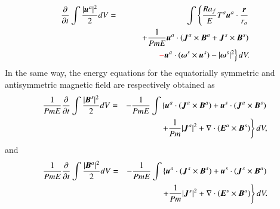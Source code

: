 %
\begin{eqnarray}
\displaystyle
\frac{\partial}{\partial t}
 \int \frac{|\mbox{\boldmath$u$}^a|^2}{2} d V 
 & = & \displaystyle
\int \left\{
      \frac{Ra_f}{E}T^a \mbox{\boldmath$u$}^a\cdot \frac{\mbox{\boldmath$r$}}{r_{o}}
     \right.
\nonumber \\
& & \displaystyle
\hspace*{2em}
     \left.
    + \frac{1}{Pm E} \mbox{\boldmath$u$}^a \cdot
                (\mbox{\boldmath$J$}^a \times \mbox{\boldmath$B$}^a
                +\mbox{\boldmath$J$}^s \times \mbox{\boldmath$B$}^s)
      \right.
\nonumber \\
& & \displaystyle
\hspace*{3em}
      \left.
     {\color{red} - } \mbox{\boldmath$u$}^a \cdot 
       (\mbox{\boldmath$\omega$}^s \times \mbox{\boldmath$u$}^s)
    - |\mbox{\boldmath$\omega$}^s|^2 
      \right\} d V.
\label{eq:energy_ua}
\end{eqnarray}
%
In the same way, the energy equations for the equatorially symmetric and antisymmetric magnetic field are respectively obtained as
%
\begin{eqnarray}
\displaystyle
\frac{1}{Pm E}\frac{\partial}{\partial t}
 \int \frac{|\mbox{\boldmath$B$}^s|^2}{2} d V
 & = & - \frac{1}{Pm E}\int \left\{
      \mbox{\boldmath$u$}^a \cdot 
          ( \mbox{\boldmath$J$}^a \times \mbox{\boldmath$B$}^a )
    + \mbox{\boldmath$u$}^s \cdot 
          ( \mbox{\boldmath$J$}^a \times \mbox{\boldmath$B$}^s )
    \right.
\nonumber \\
\hspace{3em}
&& \displaystyle
    \left.
    + \frac{1}{Pm} |\mbox{\boldmath$J$}^a|^2
    + \nabla \cdot ( \mbox{\boldmath$E$}^a \times \mbox{\boldmath$B$}^s ) 
      \right\} d V,
\label{eq:energy_Bs}
\end{eqnarray}
%
and 
%
\begin{eqnarray}
\displaystyle
\frac{1}{Pm E}\frac{\partial}{\partial t}
 \int \frac{|\mbox{\boldmath$B$}^a|^2}{2} d V 
& = & \displaystyle
- \frac{1}{Pm E}\int \left\{
      \mbox{\boldmath$u$}^a \cdot 
          ( \mbox{\boldmath$J$}^s \times \mbox{\boldmath$B$}^s )
    + \mbox{\boldmath$u$}^s \cdot ( \mbox{\boldmath$J$}^s \times \mbox{\boldmath$B$}^a )
    \right.
\nonumber \\
\hspace{3em}
 & & \displaystyle
    \left.
    + \frac{1}{Pm} |\mbox{\boldmath$J$}^s|^2
    + \nabla \cdot ( \mbox{\boldmath$E$}^s \times \mbox{\boldmath$B$}^a ) 
      \right\} d V.
\label{eq:energy_Ba}
\end{eqnarray}

